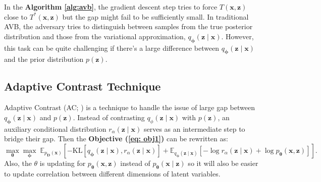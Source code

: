 \documentclass[a4paper,12pt]{article}
\theoremstyle{plain} %
\theoremstyle{remark} %
\theoremstyle{definition} %
\begin{document}
In the \textbf{Algorithm \ref{alg:avb}}, the gradient descent step tries to force $T(\bm{x},\bm{z})$ close to $T^*(\bm{x},\bm{z})$ but the gap might fail to be sufficiently small. In traditional AVB, the adversary tries to distinguish between samples from the true posterior distribution and those from the variational approximation, $q_{\bm{\phi}}(\bm{z}\mid\bm{x})$. However, this task can be quite challenging if there’s a large difference between $q_{\bm{\phi}}(\bm{z}\mid\bm{x})$ and the prior distribution $p(\bm{z})$.

\subsection{Adaptive Contrast Technique}
Adaptive Contrast (AC; \citealp{mescheder2017adversarial}) is a technique to handle the issue of large gap between $q_{\bm{\phi}}(\bm{z}\mid\bm{x})$ and $p(\bm{z})$. Instead of contrasting $q_{\phi}(\bm{z}\mid\bm{x})$ with $p(\bm{z})$, an auxiliary conditional distribution $r_{\alpha}(\bm{z}\mid\bm{x})$ serves as an intermediate step to bridge their gap. Then the \textbf{Objective (\ref{eq: obj1})} can be rewritten as:
\begin{equation}\label{eq: obj-AC}
\max_{\bm{\theta}} \max_{\bm{\phi}} \;\mathbb{E}_{p_{\bm{D}}(\bm{x})} \left[ 
- \text{KL}\left[ q_{\bm{\phi}}(\bm{z}\mid\bm{x}), r_{\alpha}(\bm{z}\mid\bm{x})\right]
+ \mathbb{E}_{q_{\bm{\phi}}(\bm{z} \mid \bm{x})}\left[-\log r_{\alpha}(\bm{z}\mid\bm{x}) + \log p_{\bm{\theta}}(\bm{x} , \bm{z}) 
\right]\right].
\end{equation}
Also, the $\theta$ is updating for $p_{\bm{\theta}}(\bm{x} , \bm{z})$ instead of $p_{\bm{\theta}}(\bm{x} \mid \bm{z})$ so it will also be easier to update correlation between different dimensions of latent variables.
\end{document}
